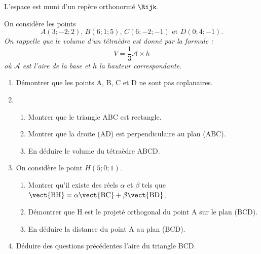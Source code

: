L'espace est muni d'un repère orthonormé $\Rijk$.

On considère les points \[A(3;-2;2) \text{, } B(6;1;5) \text{, } C(6;-2;-1) \text{ et } D(0;4;-1).\]%
\emph{On rappelle que le volume d'un tétraèdre est donné par la formule :}\[V = \dfrac13 \mathcal{A} \times h\]%
\emph{où $\mathcal{A}$ est l'aire de la base et $h$ la hauteur correspondante.}

\begin{enumerate}
	\item Démontrer que les points A, B, C et D ne sont pas coplanaires.
	\item 
	\begin{enumerate}
		\item Montrer que le triangle ABC est rectangle.
		\item Montrer que la droite (AD) est perpendiculaire au plan (ABC).
		\item En déduire le volume du tétraèdre ABCD.
	\end{enumerate}	
	\item On considère le point $H(5;0;1)$.
	\begin{enumerate}
		\item Montrer qu'il existe des réels $\alpha$ et $\beta$ tels que $\vect{\text{BH}} = \alpha \vect{\text{BC}} + \beta \vect{\text{BD}}$.
		\item Démontrer que H est le projeté orthogonal du point A sur le plan (BCD). 
		\item En déduire la distance du point A au plan (BCD).
	\end{enumerate}	
	\item Déduire des questions précédentes l'aire du triangle BCD.
\end{enumerate}


